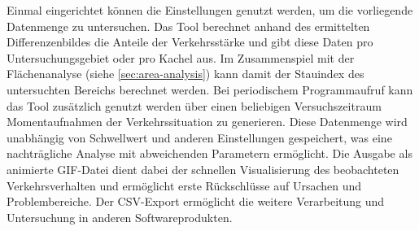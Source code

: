 Einmal eingerichtet können die Einstellungen genutzt werden, um die vorliegende Datenmenge zu untersuchen. Das Tool berechnet anhand des ermittelten Differenzenbildes die Anteile der Verkehrsstärke und gibt diese Daten pro Untersuchungsgebiet oder pro Kachel aus. Im Zusammenspiel mit der Flächenanalyse (siehe \ref{sec:area-analysis}) kann damit der Stauindex des untersuchten Bereichs berechnet werden. Bei periodischem Programmaufruf kann das Tool zusätzlich genutzt werden über einen beliebigen Versuchszeitraum Momentaufnahmen der Verkehrssituation zu generieren. Diese Datenmenge wird unabhängig von Schwellwert und anderen Einstellungen gespeichert, was eine nachträgliche Analyse mit abweichenden Parametern ermöglicht. Die Ausgabe als animierte GIF-Datei dient dabei der schnellen Visualisierung des beobachteten Verkehrsverhalten und ermöglicht erste Rückschlüsse auf Ursachen und Problembereiche. Der CSV-Export ermöglicht die weitere Verarbeitung und Untersuchung in anderen Softwareprodukten.

